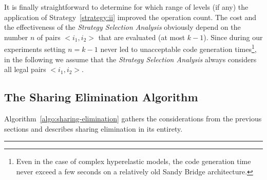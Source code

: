 It is finally straightforward to determine for which range of levels (if any) the application of Strategy~\ref{strategy:ii} improved the operation count. The cost and the effectiveness of the {\em Strategy Selection Analysis} obviously depend on the number $n$ of pairs ${<}i_1, i_2{>}$ that are evaluated (at most $k - 1$). Since during our experiments setting $n = k - 1$ never led to unacceptable code generation times\footnote{Even in the case of complex hyperelastic models, the code generation time never exceed a few seconds on a relatively old Sandy Bridge architecture.}, in the following we assume that the {\em Strategy Selection Analysis} always considers all legal pairs ${<}i_1, i_2{>}$.


\subsection{The Sharing Elimination Algorithm}
\label{sec:se-algo}
Algorithm~\ref{algo:sharing-elimination} gathers the considerations from the previous sections and describes sharing elimination in its entirety. 

\noindent\rule[0.01ex]{\linewidth}{0.7pt}

